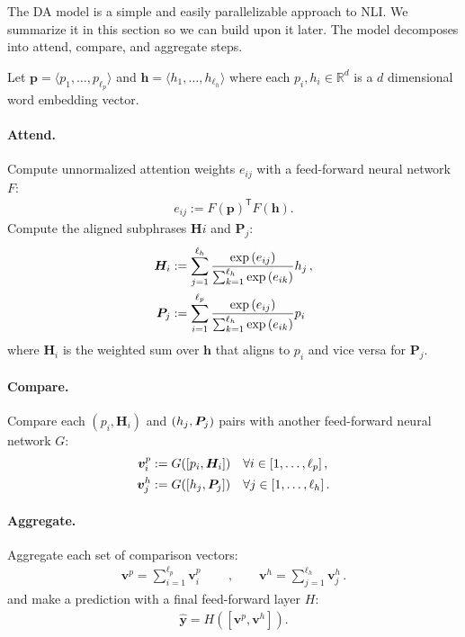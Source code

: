 \documentclass[11pt,a4paper]{article}
\begin{document}
The DA model is a simple and easily parallelizable approach to NLI.
We summarize it in this section so we can build upon it later.
The model
decomposes into attend, compare, and aggregate steps.

Let
$\bm{p} = \langle p_1, \dots, p_{\ell_p} \rangle$ and
$\bm{h} = \langle h_1, \dots, h_{\ell_h} \rangle$ where each $p_i, h_i \in \mathbb{R}^d$
is a $d$ dimensional word embedding vector.

\paragraph{Attend.} Compute unnormalized attention weights $e_{ij}$ with
a feed-forward neural network $F$:
\begin{align}
    e_{ij} := F(\bm{p})^\mathsf{T} F(\bm{h}).
\end{align}
Compute the aligned subphrases $\bm{H}i$ and $\bm{P}_j$:
\begin{align}
    \bm{H}_i &:= \sum_{j=1}^{\ell_h}\frac{\exp{(e_{ij})}}
                                        {\sum_{k=1}^{\ell_h}\exp{(e_{ik})}}h_j\,, \notag \\
    \bm{P}_j &:= \sum_{i=1}^{\ell_p}\frac{\exp{(e_{ij})}}
                                        {\sum_{k=1}^{\ell_h}\exp{(e_{ik})}}p_i\
\end{align}
where $\bm{H}_i$ is the weighted sum over $\bm{h}$ that aligns to $p_i$ and vice versa
for $\bm{P}_j$.

\paragraph{Compare.} Compare each $(p_i, \bm{H}_i)$ and $(h_j, \bm{P_}j)$ pairs
with another feed-forward neural network $G$:
\begin{align}
    \bm{v}^p_i &:= G([p_i, \bm{H}_i])\quad \forall i \in [1,\ldots, \ell_p]\,, \notag \\
    \bm{v}^h_j &:= G([h_j, \bm{P}_j])\quad \forall j \in [1,\ldots, \ell_h]\,.
\end{align}

\paragraph{Aggregate.} Aggregate each set of comparison vectors:
\begin{align}
\bm{v}^p = \sum_{i=1}^{\ell_p} \bm{v}^p_i \qquad\,, \qquad
\bm{v}^h = \sum_{j=1}^{\ell_h}  \bm{v}^h_j\,.
\end{align}
and make a prediction with a final feed-forward layer $H$:
\begin{align}\label{eq:predict}
    \hat{\bm{y}} = H([\bm{v}^p, \bm{v}^h]).
\end{align}
\end{document}
